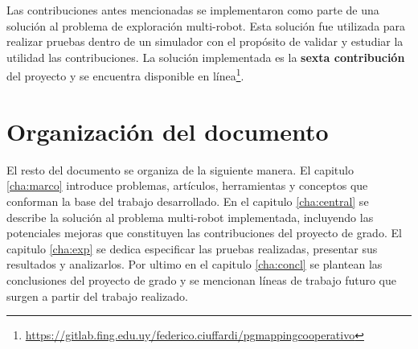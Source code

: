


Las contribuciones antes mencionadas se implementaron como parte de una
solución al problema de exploración multi-robot. Esta solución fue utilizada para
realizar pruebas dentro de un simulador con el propósito de validar y estudiar
la utilidad las contribuciones. La solución implementada es la \textbf{sexta
contribución} del proyecto y se encuentra disponible en
línea\footnote{\url{https://gitlab.fing.edu.uy/federico.ciuffardi/pgmappingcooperativo}}.

\section{Organización del documento}
El resto del documento se organiza de la siguiente manera. El capitulo
\ref{cha:marco} introduce problemas, artículos, herramientas y conceptos que
conforman la base del trabajo desarrollado. En el capitulo \ref{cha:central} se
describe la solución al problema multi-robot implementada, incluyendo las
potenciales mejoras que constituyen las contribuciones del proyecto de grado. El
capitulo \ref{cha:exp} se dedica especificar las pruebas realizadas, presentar
sus resultados y analizarlos. Por ultimo en el capitulo \ref{cha:concl} se
plantean las conclusiones del proyecto de grado y se mencionan líneas de
trabajo futuro que surgen a partir del trabajo realizado.


